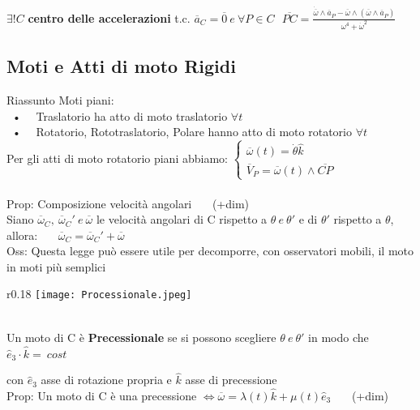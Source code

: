 \documentclass{article}
\begin{document}
$\exists! C$ \textbf{centro delle accelerazioni} t.c. $\overline{a}_C = \overline{0} \ e \ \forall P \in C \ \ \ \overline{PC} = \frac{  \dot{\overline{\omega}}\wedge\overline{a}_P - \overline{\omega}\wedge(\overline{\omega}\wedge\overline{a}_P) }{ \omega^4 + \dot{\omega}^2  } $ \\




\subsection{Moti e Atti di moto Rigidi}
%
%
%
Riassunto Moti piani:\\
\ • \ \ Traslatorio ha atto di moto traslatorio $\forall t$\\
\ • \ \ Rotatorio, Rototraslatorio, Polare hanno atto di moto rotatorio $\forall t$\\
Per gli atti di moto rotatorio piani abbiamo: $\begin{cases}
\overline{\omega}(t)=\dot{\theta}\hat{k} \\
\overline{V}_P=\overline{\omega}(t)\wedge\overline{CP}
\end{cases}$ \\ \\
%
%
%
Prop: Composizione velocità angolari \ \ \ (+dim)\\
\phantom{Prop: }Siano $\overline{\omega}_C, \ \overline{\omega}_C' \ e \ \overline{\omega}$ le velocità angolari di C rispetto a $\theta \ e\ \theta'$ e di $\theta'$ rispetto a $\theta$, allora: \ \ \ $\overline{\omega}_C = \overline{\omega}_C' + \overline{\omega}$ \\
Oss: Questa legge può essere utile per decomporre, con osservatori mobili, il moto in moti più semplici
%
%
%
\begin{wrapfigure}{r}{0.18\textwidth}
\texttt{[image: Processionale.jpeg]}
\end{wrapfigure} \\
%
Un moto di C è \textbf{Precessionale} se si possono scegliere $\theta \ e\ \theta'$ in modo che $\hat{e}_3\cdot\hat{k} = \ cost$

con $\hat{e}_3$ asse di rotazione propria e $\hat{k}$ asse di precessione \\
Prop: Un moto di C è una precessione $\Longleftrightarrow \overline{\omega}= \lambda(t)\hat{k}+\mu(t)\hat{e}_3$ \ \ \ (+dim) \\
\pagebreak


%
%
\end{document}
